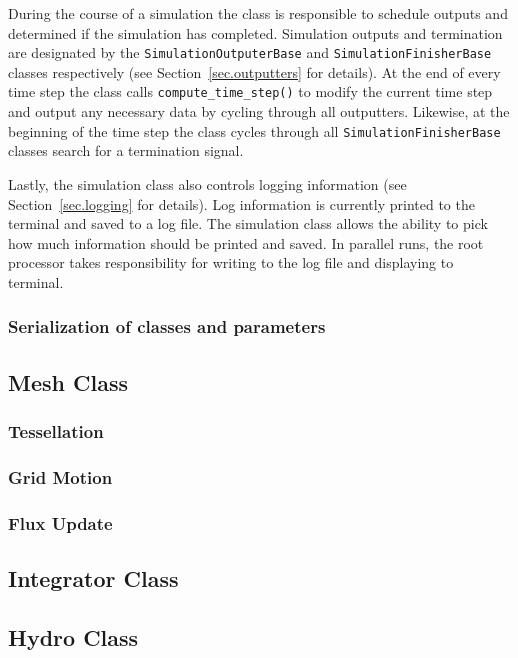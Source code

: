 During the course of a simulation the class is responsible to schedule outputs and
determined if the simulation has completed. Simulation outputs and termination are 
designated by the \lstinline{SimulationOutputerBase} and \lstinline{SimulationFinisherBase} 
classes respectively (see Section~\ref{sec.outputters} for details). At the end of every time
step the class calls \lstinline{compute_time_step()} to modify the current time step and
output any necessary data by cycling through all outputters. Likewise, at the beginning of
the time step the class cycles through all \lstinline{SimulationFinisherBase} classes 
search for a termination signal.

Lastly, the simulation class also controls logging information (see Section~\ref{sec.logging}
for details). 
Log information is currently printed to the terminal and saved to a log file. The simulation class 
allows the ability to pick how much information should be printed and saved. In parallel runs, the 
root processor takes responsibility for writing to the log file and displaying to terminal.

\subsubsection{Serialization of classes and parameters}

\subsection{Mesh Class}
\subsubsection{Tessellation}
\subsubsection{Grid Motion}
\subsubsection{Flux Update}

\subsection{Integrator Class}
\label{sec.integrator}

\subsection{Hydro Class}
